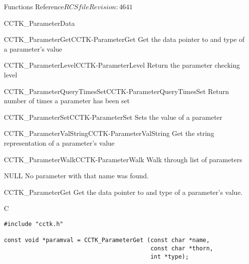 \begin{cactuspart}{ Functions Reference}{$RCSfile$}{$Revision: 4641 $}
\begin{FunctionDescription}{CCTK\_ParameterData}
\begin{SeeAlsoSection}
\begin{SeeAlso2}{CCTK\_ParameterGet}{CCTK-ParameterGet}
  Get the data pointer to and type of a parameter's value
\end{SeeAlso2}
\begin{SeeAlso2}{CCTK\_ParameterLevel}{CCTK-ParameterLevel}
  Return the parameter checking level
\end{SeeAlso2}
\begin{SeeAlso2}{CCTK\_ParameterQueryTimesSet}{CCTK-ParameterQueryTimesSet}
  Return number of times a parameter has been set
\end{SeeAlso2}
\begin{SeeAlso2}{CCTK\_ParameterSet}{CCTK-ParameterSet}
  Sets the value of a parameter
\end{SeeAlso2}
\begin{SeeAlso2}{CCTK\_ParameterValString}{CCTK-ParameterValString}
  Get the string representation of a parameter's value
\end{SeeAlso2}
\begin{SeeAlso2}{CCTK\_ParameterWalk}{CCTK-ParameterWalk}
  Walk through list of parameters
\end{SeeAlso2}
\end{SeeAlsoSection}

\begin{ErrorSection}
\begin{Error}{NULL}
No parameter with that name was found.
\end{Error}
\end{ErrorSection}
\end{FunctionDescription}


\begin{FunctionDescription}{CCTK\_ParameterGet}
\label{CCTK-ParameterGet}
Get the data pointer to and type of a parameter's value.

\begin{SynopsisSection}
\begin{Synopsis}{C}
\begin{verbatim}
#include "cctk.h"

const void *paramval = CCTK_ParameterGet (const char *name,
                                          const char *thorn,
                                          int *type);
\end{verbatim}
\end{Synopsis}
\end{SynopsisSection}


\end{FunctionDescription}
\end{cactuspart}
